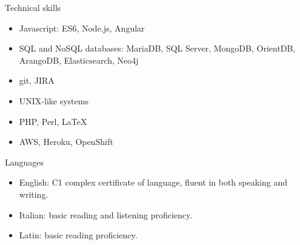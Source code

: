 Technical skills

  \begin{itemize}
    \item{Javascript: ES6, Node.js, Angular}
    \item{SQL and NoSQL databases: MariaDB, SQL Server, 
      MongoDB, OrientDB, ArangoDB, Elasticsearch, Neo4j}
    \item{git, JIRA}
    \item{UNIX-like systems}
    \item{PHP, Perl, \LaTeX}
    \thispagestyle{fancy}
    \item{AWS, Heroku, OpenShift}
  \end{itemize}

Languages
  
  \begin{itemize}
    \item{English: C1 complex certificate of language, fluent in both speaking and writing.}
    \item{Italian: basic reading and listening proficiency.}
    \item{Latin: basic reading proficiency.}
  \end{itemize}

\thispagestyle{fancy}

